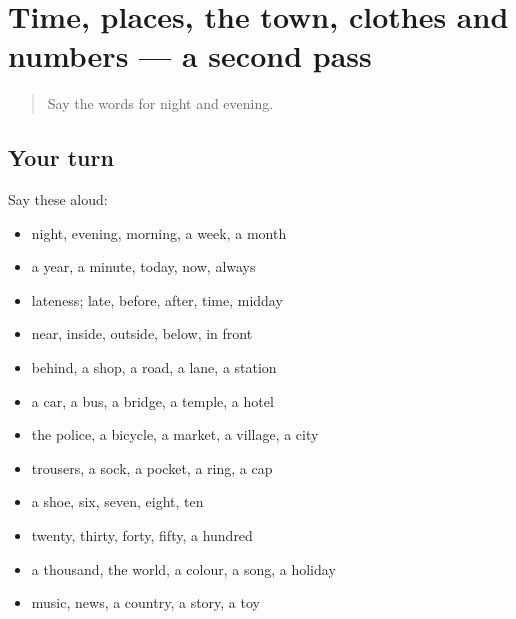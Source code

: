 \section[(dialogue)]{Time, places, the town, clothes and numbers — a second pass}

\label{lesson:BN-R89-second-pass-time-places-the-town-clothes-and-numbers}



\begin{quote}
Say the words for night and evening.
\end{quote}

\subsection*{Your turn}
Say these aloud:

\begin{itemize}
\raggedright
  \item night, evening, morning, a week, a month
  \item a year, a minute, today, now, always
  \item lateness; late, before, after, time, midday
  \item near, inside, outside, below, in front
  \item behind, a shop, a road, a lane, a station
  \item a car, a bus, a bridge, a temple, a hotel
  \item the police, a bicycle, a market, a village, a city
  \item trousers, a sock, a pocket, a ring, a cap
  \item a shoe, six, seven, eight, ten
  \item twenty, thirty, forty, fifty, a hundred
  \item a thousand, the world, a colour, a song, a holiday
  \item music, news, a country, a story, a toy
\end{itemize}

